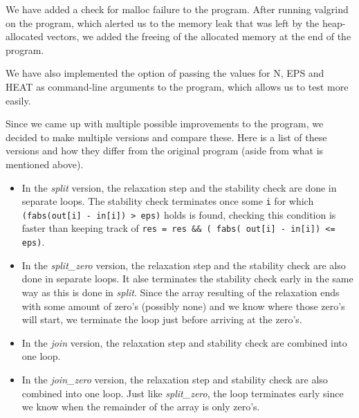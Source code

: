 \documentclass[a4paper]{article}
\begin{document}
\noindent We have added a check for malloc failure to the program. After running valgrind on the program, which alerted us to the memory leak that was left by the heap-allocated vectors, we added the freeing of the allocated memory at the end of the program. 

We have also implemented the option of passing the values for N, EPS and HEAT as command-line arguments to the program, which allows us to test more easily.

Since we came up with multiple possible improvements to the program, we decided to make multiple versions and compare these. Here is a list of these versions and how they differ from the original program (aside from what is mentioned above).
\begin{itemize}
    \item In the \textit{split} version, the relaxation step and the stability check are done in separate loops. The stability check terminates once some \texttt{i} for which \texttt{(fabs(out[i] - in[i]) > eps)} holds is found, checking this condition is faster than keeping track of \texttt{res = res \&\& ( fabs( out[i] - in[i]) <= eps)}.
    \item In the \textit{split\_zero} version, the relaxation step and the stability check are also done in separate loops. It alse terminates the stability check early in the same way as this is done in \textit{split}. Since the array resulting of the relaxation ends with some amount of zero's (possibly none) and we know where those zero's will start, we terminate the loop just before arriving at the zero's.
    \item In the \textit{join} version, the relaxation step and stability check are combined into one loop. 
    \item In the \textit{join\_zero} version, the relaxation step and stability check are also combined into one loop. Just like \textit{split\_zero}, the loop terminates early since we know when the remainder of the array is only zero's.
\end{itemize}
\end{document}
